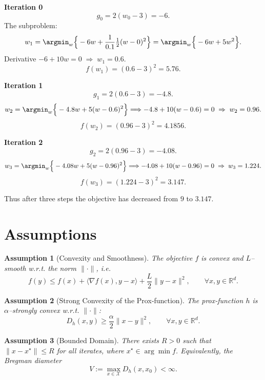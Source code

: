 \documentclass{article}
\newtheorem{assumption}{Assumption}
\newcommand{\inner}[2]{\langle #1,#2\rangle}
\newcommand{\grad}{\nabla}
\newcommand{\D}[2]{D_{h}(#1,#2)}
\begin{document}
\medskip
\noindent\textbf{Iteration 0}
\[
g_{0}=2(w_{0}-3) = -6.
\]
The subproblem:
\[
w_{1}= \argmin_{w}\Big\{-6 w +\frac{1}{0.1}\tfrac12 (w-0)^{2}\Big\}
      =\argmin_{w}\Big\{-6 w +5 w^{2}\Big\}.
\]
Derivative $-6+10w=0\;\Rightarrow\;w_{1}=0.6$.
\[
f(w_{1})=(0.6-3)^{2}=5.76.
\]

\medskip
\noindent\textbf{Iteration 1}
\[
g_{1}=2(0.6-3) = -4.8.
\]
\[
w_{2}= \argmin_{w}\Big\{-4.8 w +5 (w-0.6)^{2}\Big\}
      \Longrightarrow -4.8+10(w-0.6)=0\;\Rightarrow\; w_{2}=0.96.
\]
\[
f(w_{2})=(0.96-3)^{2}=4.1856.
\]

\medskip
\noindent\textbf{Iteration 2}
\[
g_{2}=2(0.96-3) = -4.08.
\]
\[
w_{3}= \argmin_{w}\Big\{-4.08 w +5 (w-0.96)^{2}\Big\}
      \Longrightarrow -4.08+10(w-0.96)=0\;\Rightarrow\; w_{3}=1.224.
\]
\[
f(w_{3})=(1.224-3)^{2}=3.147.
\]

Thus after three steps the objective has decreased from $9$ to $3.147$.

\section*{Assumptions}
\begin{assumption}[Convexity and Smoothness]\label{ass:convex}
The objective $f$ is convex and $L$–smooth w.r.t. the norm $\|\cdot\|$, i.e.
\[
f(y)\le f(x)+\inner{\grad f(x)}{y-x}+\frac{L}{2}\|y-x\|^{2},
\qquad\forall x,y\in\mathbb{R}^{d}.
\]
\end{assumption}

\begin{assumption}[Strong Convexity of the Prox‑function]\label{ass:hstrong}
The prox‑function $h$ is $\alpha$–strongly convex w.r.t. $\|\cdot\|$:
\[
\D{x}{y}\ge\frac{\alpha}{2}\|x-y\|^{2},
\qquad\forall x,y\in\mathbb{R}^{d}.
\]
\end{assumption}

\begin{assumption}[Bounded Domain]\label{ass:bounded}
There exists $R>0$ such that $\|x-x^{\star}\|\le R$ for all iterates,
where $x^{\star}\in\arg\min f$.
Equivalently, the Bregman diameter
\[
V:=\max_{x\in\mathcal{X}} \D{x}{x_{0}}<\infty .
\]
\end{assumption}

\end{document}

